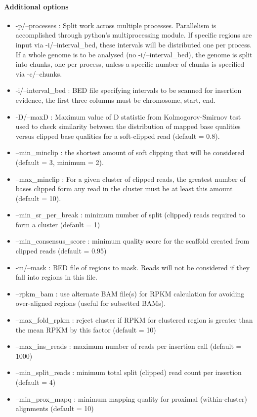 \documentclass[letterpaper,11pt]{article}
\begin{document}
\paragraph{Additional options}
\begin{itemize}
\item -p/--processes :  Split work across multiple processes. Parallelism is accomplished through python's multiprocessing module. If specific regions are input via -i/--interval\_bed, these intervals will be distributed one per process. If a whole genome is to be analysed (no -i/--interval\_bed), the genome is split into chunks, one per process, unless a specific number of chunks is specified via -c/--chunks.
\item -i/--interval\_bed : BED file specifying intervals to be scanned for insertion evidence, the first three columns must be chromosome, start, end.
\item -D/--maxD : Maximum value of D statistic from Kolmogorov-Smirnov test used to check similarity between the distribution of mapped base qualities versus clipped base qualities for a soft-clipped read (default = 0.8).
\item --min\_minclip : the shortest amount of soft clipping that will be considered (default = 3, minimum = 2).
\item --max\_minclip : For a given cluster of clipped reads, the greatest number of bases clipped form any read in the cluster must be at least this amount (default = 10).
\item --min\_sr\_per\_break : minimum number of split (clipped) reads required to form a cluster (default = 1)
\item --min\_consensus\_score : minimum quality score for the scaffold created from clipped reads (default = 0.95)
\item -m/--mask : BED file of regions to mask. Reads will not be considered if they fall into regions in this file.
\item --rpkm\_bam : use alternate BAM file(s) for RPKM calculation for avoiding over-aligned regions (useful for subsetted BAMs).
\item --max\_fold\_rpkm : reject cluster if RPKM for clustered region is greater than the mean RPKM by this factor (default = 10)
\item --max\_ins\_reads : maximum number of reads per insertion call (default = 1000)
\item --min\_split\_reads : minimum total split (clipped) read count per insertion (default = 4)
\item --min\_prox\_mapq : minimum mapping quality for proximal (within-cluster) alignments (default = 10)

\end{itemize}
\end{document}
